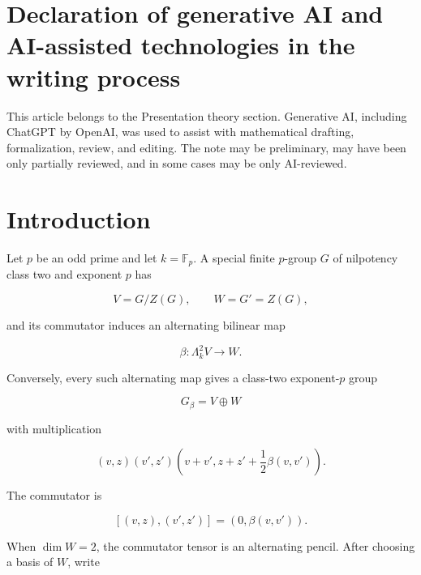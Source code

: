 \documentclass[11pt]{article}
\begin{document}
\begin{abstract}
Combining these ingredients, the Fourier-tagged commutator-word distributions recover the singular minimal-index multiset and the regular elementary-divisor divisor, up to the natural $\operatorname{PGL}_2(k)$-action on the parameter line. Consequently, for special class-two exponent-$p$ groups $G_\beta$ with

\[
\dim_{\mathbb F_p}G'=2,
\]

these distributions determine the group isomorphism class.

The result is exact and finite. It is not presented as a practical isomorphism algorithm; the contribution is the complete word-moment observability of the Kronecker canonical data of an alternating pencil.

\end{abstract}

\section*{Declaration of generative AI and AI-assisted technologies in the writing process}
This article belongs to the Presentation theory section. Generative AI, including ChatGPT by \mbox{OpenAI}, was used to assist with mathematical drafting, formalization, review, and editing. The note may be preliminary, may have been only partially reviewed, and in some cases may be only AI-reviewed.

\section{Introduction}

Let $p$ be an odd prime and let $k=\mathbb F_p$. A special finite $p$-group $G$ of nilpotency class two and exponent $p$ has

\[
V=G/Z(G),
\qquad
W=G'=Z(G),
\]

and its commutator induces an alternating bilinear map

\[
\beta:\Lambda^2_k V\to W.
\]

Conversely, every such alternating map gives a class-two exponent-$p$ group

\[
G_\beta=V\oplus W
\]

with multiplication

\[
(v,z)(v',z')
\left(v+v',
z+z'+\frac12\beta(v,v')\right).
\]

The commutator is

\[
[(v,z),(v',z')]=(0,\beta(v,v')).
\]

When $\dim W=2$, the commutator tensor is an alternating pencil. After choosing a basis of $W$, write
\end{document}
